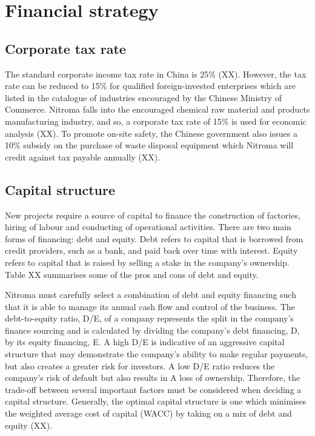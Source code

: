 \section{Financial strategy}
\subsection{Corporate tax rate}
The standard corporate income tax rate in China is 25\% (XX). However, the tax rate can be reduced to 15\% for qualified foreign-invested enterprises which are listed in the catalogue of industries encouraged by the Chinese Ministry of Commerce. Nitroma falls into the encouraged chemical raw material and products manufacturing industry, and so, a corporate tax rate of 15\% is used for economic analysis (XX). To promote on-site safety, the Chinese government also issues a 10\% subsidy on the purchase of waste disposal equipment which Nitroma will credit against tax payable annually (XX).

\subsection{Capital structure}
New projects require a source of capital to finance the construction of factories, hiring of labour and conducting of operational activities. There are two main forms of financing: debt and equity. Debt refers to capital that is borrowed from credit providers, such as a bank, and paid back over time with interest. Equity refers to capital that is raised by selling a stake in the company’s ownership. Table XX summarises some of the pros and cons of debt and equity.

Nitroma must carefully select a combination of debt and equity financing such that it is able to manage its annual cash flow and control of the business. The debt-to-equity ratio, D/E, of a company represents the split in the company’s finance sourcing and is calculated by dividing the company’s debt financing, D, by its equity financing, E. A high D/E is indicative of an aggressive capital structure that may demonstrate the company’s ability to make regular payments, but also creates a greater risk for investors. A low D/E ratio reduces the company’s risk of default but also results in A loss of ownership. Therefore, the trade-off between several important factors must be considered when deciding a capital structure. Generally, the optimal capital structure is one which minimises the weighted average cost of capital (WACC) by taking on a mix of debt and equity (XX).

